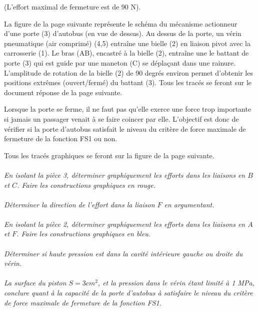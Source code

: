 \documentclass[11pt,oneside]{article}
\begin{document}
(L'effort maximal de fermeture est de 90\; N).

La figure de la page suivante représente le schéma du mécanisme actionneur d'une porte (3) d'autobus (en vue de dessus). Au dessus de la porte, un vérin pneumatique (air comprimé) (4,5) entraîne une bielle (2) en liaison pivot avec la carrosserie (1). Le bras (AB), encastré à la bielle (2), entraîne une le battant de porte (3) qui est guide par une maneton (C) se déplaçant dans une rainure. L'amplitude de rotation de la bielle (2) de 90 degrés environ permet d'obtenir les positions extrêmes (ouvert/fermé) du battant (3). Tous les tracés se feront sur le document réponse de la page suivante. 

Lorsque la porte se ferme, il ne faut pas qu'elle exerce une force trop importante si jamais un passager venait à se faire coincer par elle. L'objectif est donc de vérifier si la porte d'autobus satisfait le niveau du critère de force maximale de fermeture de la fonction FS1 ou non.

Tous les tracés graphiques se feront sur la figure de la page suivante. 

\paragraph{}
\textit{En isolant la pièce 3, déterminer graphiquement les efforts dans les liaisons en $B$ et $C$. Faire les constructions graphiques en rouge.}

\paragraph{}
\textit{Déterminer la direction de l'effort dans la liaison $F$ en argumentant.}

\paragraph{}
\textit{En isolant la pièce 2, déterminer graphiquement les efforts dans les liaisons en $A$ et $F$. Faire les constructions graphiques en bleu.}

\paragraph{}
\textit{Déterminer si haute pression est dans la cavité intérieure gauche ou droite du vérin.}

\paragraph{}
\textit{La surface du piston $S=3cm^2$, et la pression dans le vérin étant limité à 1 MPa, conclure quant à la capacité de la porte d'autobus à satisfaire le niveau du critère de force maximale de fermeture de la fonction FS1.}
\end{document}
